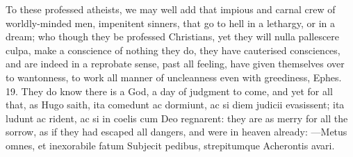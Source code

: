 {To these professed atheists, we may well add that impious and carnal
crew of worldly-minded men, impenitent sinners, that go to hell in a
lethargy, or in a dream; who though they be professed Christians, yet
they will nulla pallescere culpa, make a conscience of nothing they do,
they have cauterised consciences, and are indeed in a reprobate sense,
past all feeling, have given themselves over to wantonness, to work all
manner of uncleanness even with greediness, Ephes.  19. They do know
there is a God, a day of judgment to come, and yet for all that, as
Hugo saith, ita comedunt ac dormiunt, ac si diem judicii evasissent;
ita ludunt ac rident, ac si in coelis cum Deo regnarent: they are as
merry for all the sorrow, as if they had escaped all dangers, and were
in heaven already:
---Metus omnes, et inexorabile fatum
Subjecit pedibus, strepitumque Acherontis avari.

}
